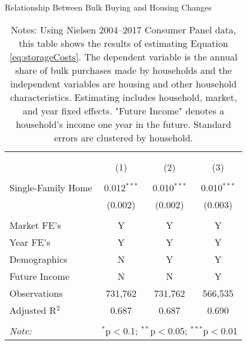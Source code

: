 \begin{table}[!htbp] \centering
  \caption{Relationship Between Bulk Buying and Housing Changes}
  \label{tab:storageCosts}
\begin{tabular}{@{\extracolsep{5pt}}lccc}
\\[-1.8ex]\hline
\hline \\[-1.8ex]
\\[-1.8ex] & (1) & (2) & (3)\\
\hline \\[-1.8ex]
 Single-Family Home & 0.012$^{***}$ & 0.010$^{***}$ & 0.010$^{***}$ \\
  & (0.002) & (0.002) & (0.003) \\
 \hline \\[-1.8ex]
Market FE's & Y & Y & Y \\
Year FE's & Y & Y & Y \\
Demographics & N & Y & Y \\
Future Income & N & N & Y \\
Observations & 731,762 & 731,762 & 566,535 \\
Adjusted R$^{2}$ & 0.687 & 0.687 & 0.690 \\
\hline
\hline \\[-1.8ex]
\textit{Note:}  & \multicolumn{3}{l}{$^{*}$p$<$0.1; $^{**}$p$<$0.05; $^{***}$p$<$0.01} \\
\end{tabular}
\caption*{Notes: Using Nielsen 2004--2017 Consumer Panel data, this table shows the results of estimating Equation \ref{eq:storageCosts}. The dependent variable is the annual share of bulk purchases made by households and the independent variables are housing and other household characteristics. Estimating includes household, market, and year fixed effects. "Future Income" denotes a household's income one year in the future. Standard errors are clustered by household.}
\end{table}
